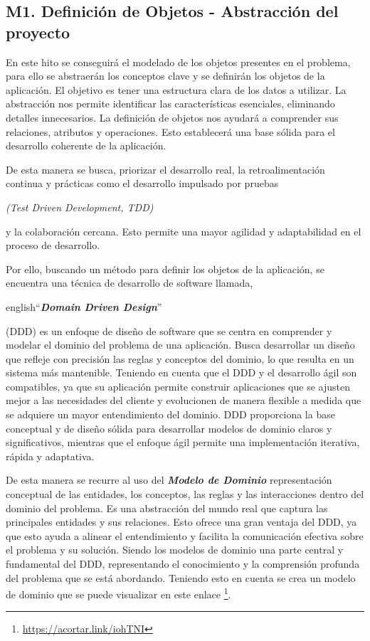 \subsection{M1. Definición de Objetos - Abstracción del proyecto}

En este hito se conseguirá el modelado de los objetos presentes en el problema, para ello se abstraerán los conceptos clave y se definirán los objetos de la aplicación. El objetivo es tener una estructura clara de los datos a utilizar. La abstracción nos permite identificar las características esenciales, eliminando detalles innecesarios. La definición de objetos nos ayudará a comprender sus relaciones, atributos y operaciones. Esto establecerá una base sólida para el desarrollo coherente de la aplicación.

De esta manera se busca, priorizar el desarrollo real, la retroalimentación continua y prácticas como el desarrollo impulsado por pruebas \begin{otherlanguage}{english}\textit{(Test
Driven Development, TDD)}\end{otherlanguage} y la colaboración cercana. Esto permite una mayor agilidad y adaptabilidad en el proceso de desarrollo.

Por ello, buscando un método para definir los objetos de la aplicación, se encuentra una técnica de desarrollo de software llamada, \begin{otherlanguage}
{english}``\textit{\textbf{Domain Driven Design}}''\end{otherlanguage}(DDD) es un enfoque de diseño de software que se centra en comprender y modelar el dominio del problema de una aplicación. Busca desarrollar un diseño que refleje con precisión las reglas y conceptos del dominio, lo que resulta en un sistema más mantenible. Teniendo en cuenta que el DDD y el desarrollo ágil son compatibles, ya que su aplicación permite construir aplicaciones que se ajusten mejor a las necesidades del cliente y evolucionen de manera flexible a medida que se adquiere un mayor entendimiento del dominio. DDD proporciona la base conceptual y de diseño sólida para desarrollar modelos de dominio claros y significativos, mientras que el enfoque ágil permite una implementación iterativa, rápida y adaptativa.

De esta manera se recurre al uso del \textit{\textbf{Modelo de Dominio}} representación conceptual de las entidades, los conceptos, las reglas y las interacciones dentro del dominio del problema. Es una abstracción del mundo real que captura las principales entidades y sus relaciones. Esto ofrece una gran ventaja del DDD, ya que esto ayuda a alinear el entendimiento y facilita la comunicación efectiva sobre el problema y su solución. Siendo los modelos de dominio una parte central y fundamental del DDD, representando el conocimiento y la comprensión profunda del problema que se está abordando. Teniendo esto en cuenta se crea un modelo de dominio que se puede visualizar en este enlace \footnote{\url{https://acortar.link/iohTNI}}.

